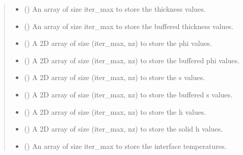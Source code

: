 \documentclass[a4paper,11pt,english,openany]{sphinxmanual}
\begin{document}
\begin{fulllineitems}
\begin{quote}
\begin{description}
\begin{itemize}
\item {} 
\sphinxAtStartPar
{} () \textendash{} An array of size iter\_max to store the thickness values.

\item {} 
\sphinxAtStartPar
{} () \textendash{} An array of size iter\_max to store the buffered thickness values.

\item {} 
\sphinxAtStartPar
{} () \textendash{} A 2D array of size (iter\_max, nz) to store the phi values.

\item {} 
\sphinxAtStartPar
{} () \textendash{} A 2D array of size (iter\_max, nz) to store the buffered phi values.

\item {} 
\sphinxAtStartPar
{} () \textendash{} A 2D array of size (iter\_max, nz) to store the s values.

\item {} 
\sphinxAtStartPar
{} () \textendash{} A 2D array of size (iter\_max, nz) to store the buffered s values.

\item {} 
\sphinxAtStartPar
{} () \textendash{} A 2D array of size (iter\_max, nz) to store the h values.

\item {} 
\sphinxAtStartPar
{} () \textendash{} A 2D array of size (iter\_max, nz) to store the solid h values.

\item {} 
\sphinxAtStartPar
{} () \textendash{} An array of size iter\_max to store the interface temperatures.


\end{itemize}
\end{description}
\end{quote}
\end{fulllineitems}
\end{document}
